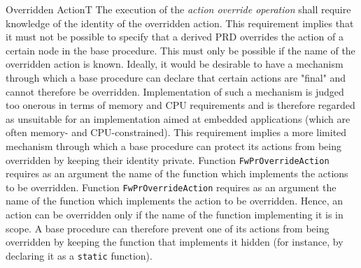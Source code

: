 \documentclass[requirements]{../fwprofile}
\begin{document}
\begin{fw_req_note}{Overridden Action}{T}
{The execution of the \emph{action override operation} shall require knowledge of the identity of the overridden action.}
{This requirement implies that it must not be possible to specify that a derived PRD overrides the action of a certain 
node in the base procedure. This must only be possible if the name of the overridden action is known.}
{Ideally, it would be desirable to have a mechanism through which a base procedure can declare that certain actions 
are "final" and cannot therefore be overridden. Implementation of such a mechanism is judged too onerous in terms of memory and CPU requirements 
and is therefore regarded as unsuitable for an implementation aimed at embedded applications (which are often memory- and CPU-constrained). 
This requirement implies a more limited mechanism through which a base procedure can protect its actions from being overridden by keeping 
their identity private.}
{Function \texttt{FwPrOverrideAction} requires as an argument the name of the function which implements the actions to be overridden.} 
{Function \texttt{FwPrOverrideAction} requires as an argument the name of the function which implements the action to be overridden. 
Hence, an action can be overridden only if the name of the function implementing it is in scope. A base procedure can therefore prevent one of its actions 
from being overridden by keeping the function that implements it hidden (for instance, by declaring it as a \texttt{static} function).}
\end{fw_req_note}


\end{document}
